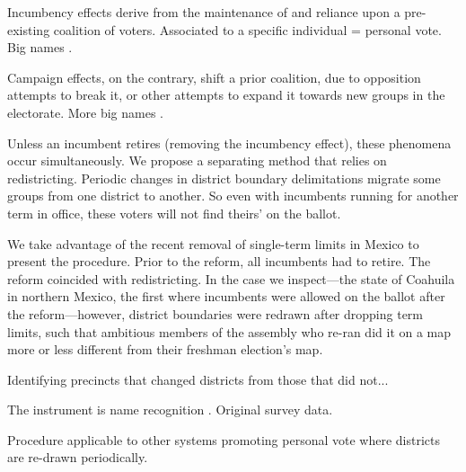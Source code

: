 \documentclass[letter,12pt]{article}
\begin{document}
Incumbency effects derive from the maintenance of and reliance upon a pre-existing coalition of voters. Associated to a specific individual = personal vote. Big names \citep{cain.etal.1987,mayhew1974vanishingMg}. 

Campaign effects, on the contrary, shift a prior coalition, due to opposition attempts to break it, or other attempts to expand it towards new groups in the electorate. More big names \citep{popkin.1991,moreno.decisElec.2009,downs.1957,sniderman-etal.1991}.



Unless an incumbent retires (removing the incumbency effect), these phenomena occur simultaneously. We propose a separating method that relies on redistricting. Periodic changes in district boundary delimitations migrate some groups from one district to another. So even with incumbents running for another term in office, these voters will not find theirs' on the ballot.

We take advantage of the recent removal of single-term limits in Mexico to present the procedure. Prior to the reform, all incumbents had to retire. The reform coincided with redistricting. In the case we inspect---the state of Coahuila in northern Mexico, the first where incumbents were allowed on the ballot after the reform---however, district boundaries were redrawn after dropping term limits, such that ambitious members of the assembly who re-ran did it on a map more or less different from their freshman election's map.

Identifying precincts that changed districts from those that did not...

The instrument is name recognition \citep{cain.etal.1987,jacobson.kernell.1983}. Original survey data.

Procedure applicable to other systems promoting personal vote \citep{carey.shugart.1995} where districts are re-drawn periodically. 

\end{document}

